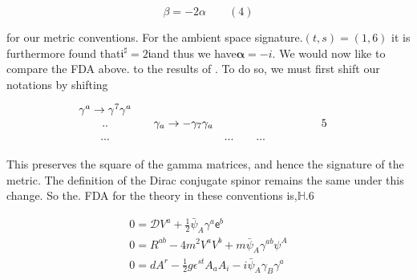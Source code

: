 \documentclass{article}
\begin{document}
\begin{equation}
\beta = - 2 \alpha \qquad ( 4 )
\end{equation}


for our metric conventions. For the ambient space signature.$( t, s ) = ( 1, 6 )$ it is furthermore
found that${ \mathfrak { i } } ^ { \sharp } = 2 { \mathfrak { i } }$and thus we have${ \pmb { \alpha } } = - i$. We would now like to compare the FDA above.
to the results of . To do so, we must first shift our notations by shifting


\begin{equation}
\begin{array} { c c c c c c c c c c c c } { \gamma ^ { a } \rightarrow \gamma ^ { 7 } \gamma ^ { a } } & { } & { } & { } & { } & { } & { } & { } & { } & { } & { } & { } \\ {.. } & { } & { \gamma _ { a } \rightarrow - \gamma _ { 7 } \gamma _ { a } } & { } & { } & { } & { } & { } & { } & { } & { 5 } \\ {... } & { } & { } & {... } & { } & {... } & { }\end{array}
\end{equation}


This preserves the square of the gamma matrices, and hence the signature of the metric.
The definition of the Dirac conjugate spinor remains the same under this change. So the.
FDA for the  theory in these conventions is,$\mathbb { H } . { 6 }$


\begin{equation}
\begin{array} { c } { 0 = \mathcal { D } V ^ { a } + \frac { 1 } { 2 } \bar { \psi } _ { A } \gamma ^ { a } \mathsf { e } ^ { b } } \\ { 0 = R ^ { a b } - 4 m ^ { 2 } V ^ { a } V ^ { b } + m \bar { \psi } _ { A } \gamma ^ { a b } \psi ^ { A } } \\ { 0 = d A ^ { r } - \frac { 1 } { 2 } g \epsilon ^ { s t } A _ { a } A _ { i } - i \bar { \psi } _ { A } \gamma _ { B } \gamma ^ { a}}\end{array}
\end{equation}
\end{document}

